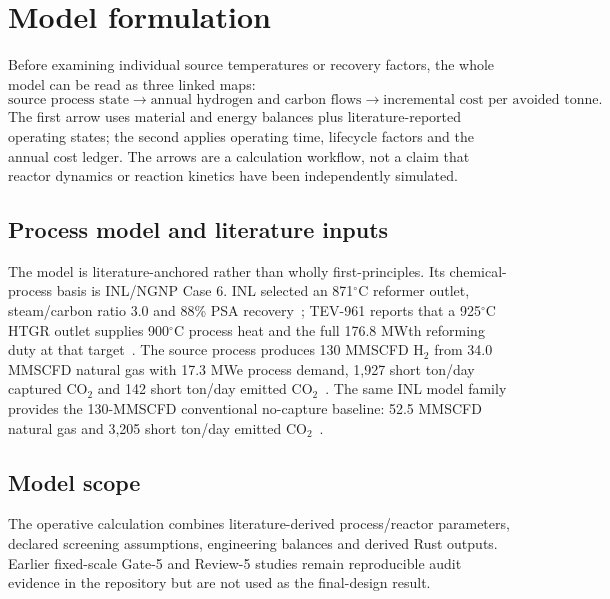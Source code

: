 \section{Model formulation}\label{sec:model-formulation}

Before examining individual source temperatures or recovery factors, the whole model can be read as three linked maps:
\[
\text{source process state}\longrightarrow
\text{annual hydrogen and carbon flows}\longrightarrow
\text{incremental cost per avoided tonne}.
\]
The first arrow uses material and energy balances plus literature-reported operating states; the second applies operating time, lifecycle factors and the annual cost ledger. The arrows are a calculation workflow, not a claim that reactor dynamics or reaction kinetics have been independently simulated.

\subsection{Process model and literature inputs}
The model is literature-anchored rather than wholly first-principles. Its chemical-process basis is INL/NGNP Case 6. INL selected an 871$^\circ$C reformer outlet, steam/carbon ratio 3.0 and 88\% PSA recovery~\cite{inltev953}; TEV-961 reports that a 925$^\circ$C HTGR outlet supplies 900$^\circ$C process heat and the full 176.8 MWth reforming duty at that target~\cite{inltev961}. The source process produces 130 MMSCFD H$_2$ from 34.0 MMSCFD natural gas with 17.3 MWe process demand, 1,927 short ton/day captured CO$_2$ and 142 short ton/day emitted CO$_2$~\cite{inltev961}. The same INL model family provides the 130-MMSCFD conventional no-capture baseline: 52.5 MMSCFD natural gas and 3,205 short ton/day emitted CO$_2$~\cite{inltev953}.


\subsection{Model scope}
The operative calculation combines literature-derived process/reactor parameters, declared screening assumptions, engineering balances and derived Rust outputs. Earlier fixed-scale Gate-5 and Review-5 studies remain reproducible audit evidence in the repository but are not used as the final-design result.

